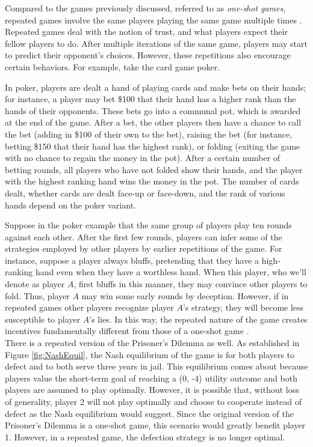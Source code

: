Compared to the games previously discussed, referred to as \textit{one-shot games}, repeated games involve the same players playing the same game multiple times \cite{mail06}. Repeated games deal with the notion of trust, and what players expect their fellow players to do. After multiple iterations of the same game, players may start to predict their opponent's choices. However, these repetitions also encourage certain behaviors. For example, take the card game poker.
\begin{exmp}
  In poker, players are dealt a hand of playing cards and make bets on their hands; for instance, a player may bet \$100 that their hand has a higher rank than the hands of their opponents. These bets go into a communal pot, which is awarded at the end of the game. After a bet, the other players then have a chance to call the bet (adding in \$100 of their own to the bet), raising the bet (for instance, betting \$150 that their hand has the highest rank), or folding (exiting the game with no chance to regain the money in the pot). After a certain number of betting rounds, all players who have not folded show their hands, and the player with the highest ranking hand wins the money in the pot. The number of cards dealt, whether cards are dealt face-up or face-down, and the rank of various hands depend on the poker variant.
\end{exmp}

Suppose in the poker example that the same group of players play ten rounds against each other. After the first few rounds, players can infer some of the strategies employed by other players by earlier repetitions of the game. For instance, suppose a player always bluffs, pretending that they have a high-ranking hand even when they have a worthless hand. When this player, who we'll denote as player $A$, first bluffs in this manner, they may convince other players to fold. Thus, player $A$ may win some early rounds by deception. However, if in repeated games other players recognize player $A$'s strategy, they will become less susceptible to player $A$'s lies. In this way, the repeated nature of the game creates incentives fundamentally different from those of a one-shot game \cite{mail06}.\\

There is a repeated version of the Prisoner's Dilemma as well. As established in Figure \ref{fig:NashEquil}, the Nash equilibrium of the game is for both players to defect and to both serve three years in jail. This equilibrium comes about because players value the short-term goal of reaching a (0, -4) utility outcome \cite{osbo94} and both players are assumed to play optimally. However, it is possible that, without loss of generality, player 2 will not play optimally and choose to cooperate instead of defect as the Nash equilibrium would suggest. Since the original version of the Prisoner's Dilemma is a one-shot game, this scenario would greatly benefit player 1. However, in a repeated game, the defection strategy is no longer optimal.\\

